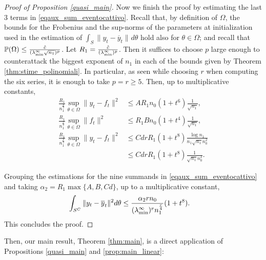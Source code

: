 \documentclass{article}
\theoremstyle{definition}
\theoremstyle{remark}
\numberwithin{equation}{section}
\newcommand{\lammin}{\lambda_{\textup{min}}}
\newcommand{\norm}[2]{
    \|#1\|_{#2}
}
\begin{document}
\begin{proof}[Proof of Proposition \ref{quasi_main}]
    Now we finish the proof by estimating the last 3 terms in \eqref{eqaux_sum_eventocattivo}.
    Recall that, by definition of $\Omega$, the bounds for the Frobenius and the sup-norms of the parameters at initialization used in the estimation of $\int_S \norm{y_t-\overline y_t}{}d\theta$ hold also for $\theta \in \Omega$;
    and recall that $\mathbb P(\Omega) \le \frac{\hat c}{(\lammin^\infty \sqrt{n_1})^p}$.
    Let $R_1 = \frac{\hat c}{(\lammin^\infty)^p}$.
    Then it suffices to choose $p$ large enough to counterattack the biggest exponent of $n_1$ in each of the bounds given by Theorem \ref{thm:stime_polinomiali}.
    In particular, as seen while choosing $r$ when computing the six series, it is enough to take $p = r\ge 5$.
    Then, up to multiplicative constants,
    \begin{align}
        \frac{R_1}{n_1^\frac{p}{2}}\sup_{\theta \in \Omega}\norm{y_t-f_t}{}^2 &\le AR_1n_0(1+t^6) \frac{1}{\sqrt{n_1}},\\
        \frac{R_1}{n_1^\frac{p}{2}}\sup_{\theta \in \Omega}\norm{f_t}{}^2 &\le R_1Bn_0(1+t^4) \frac{1}{\sqrt{n_1}},\\
        \frac{R_1}{n_1^\frac{p}{2}}\sup_{\theta \in \Omega}\norm{y_t-f_t}{}^2 &\le CdrR_1(1+t^8) \frac{\log n_1}{n_1\sqrt{n_1}n_0^2}\\
        &\le CdrR_1(1+t^8) \frac{1}{\sqrt{n_1}n_0^2}.
    \end{align}

    Grouping the estimations for the nine summands in \eqref{eqaux_sum_eventocattivo} and taking 
    $\alpha_2 = R_1\max\{A,B,Cd\}$,
     up to a multiplicative constant,
    \begin{align}
        \int_{S^C} \norm{y_t-\overline y_t}{}^2d\theta &\le \frac{\alpha_2 r n_0}{(\lammin^\infty)^rn_1^{\frac{r}{4}}}(1+t^8).
    \end{align}
This concludes the proof.
\end{proof}

Then, our main result, Theorem \ref{thm:main}, is a direct application of Propositions \ref{quasi_main} and \ref{prop:main_linear}:
\end{document}
